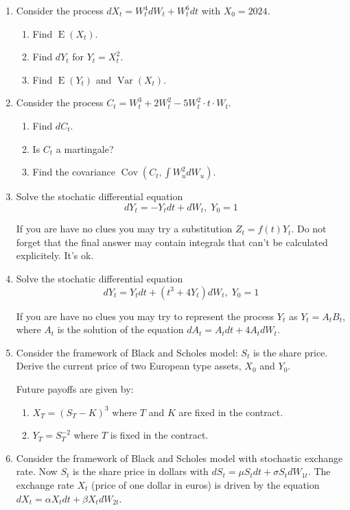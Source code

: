 \documentclass[12pt]{article}
\DeclareMathOperator{\Cov}{Cov}
\DeclareMathOperator{\Var}{Var}
\DeclareMathOperator{\E}{E}
\begin{document}
\begin{enumerate}

\item Consider the process $dX_t = W_t^4 dW_t + W_t^6 dt$ with $X_0 = 2024$.
\begin{enumerate}
  \item Find $\E(X_t)$.
  \item Find $dY_t$ for $Y_t = X_t^2$.
  \item Find $\E(Y_t)$ and $\Var(X_t)$.
\end{enumerate}

\item Consider the process $C_t = W_t^3 + 2W_t^2 - 5 W_t^2 \cdot t\cdot W_t$.
\begin{enumerate}
  \item Find $dC_t$. 
  \item Is $C_t$ a martingale?
  \item Find the covariance $\Cov(C_t, \int W^2_u dW_u)$.
\end{enumerate}

\item Solve the stochatic differential equation
\[
dY_t = - Y_t dt + dW_t, \; Y_0 = 1
\]

If you are have no clues you may try a substitution $Z_t = f(t) Y_t$. 
Do not forget that the final answer may contain integrals that can't be calculated explicitely. It's ok.

\item Solve the stochatic differential equation
\[
dY_t = Y_t dt + (t^3 + 4Y_t) dW_t, \; Y_0 = 1
\]

If you are have no clues you may try to represent the process $Y_t$ as $Y_t = A_t B_t$, 
where $A_t$ is the solution of the equation $dA_t = A_t dt + 4A_t dW_t$. 

\item Consider the framework of Black and Scholes model: $S_t$ is the share price. 
Derive the current price of two European type assets, $X_0$ and $Y_0$. 

Future payoffs are given by:
\begin{enumerate}
  \item $X_T = (S_T - K)^3$ where $T$ and $K$ are fixed in the contract.
  \item $Y_T = S_T^{-2}$ where $T$ is fixed in the contract. 
\end{enumerate}

\item Consider the framework of Black and Scholes model with stochastic exchange rate. 
Now $S_t$ is the share price in dollars with $dS_t = \mu S_t dt + \sigma S_t dW_{1t}$.
The exchange rate $X_t$ (price of one dollar in euros) is driven by the equation 
$dX_t = \alpha X_t dt + \beta X_t dW_{2t}$. 


\end{enumerate}
\end{document}
